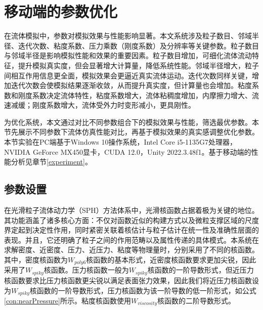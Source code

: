 







\section{移动端的参数优化}

在流体模拟中，参数对模拟效果与性能影响显著。本文系统涉及粒子数目、邻域半径、迭代次数、粘度系数、压力乘数（刚度系数）及分辨率等关键参数。粒子数目与邻域半径是影响模拟性能和效果的重要因素。粒子数目增加，可细化流体流动特征，提升模拟真实度，但会显著增大计算量，降低系统性能。邻域半径增大，粒子间相互作用信息更全面，模拟效果会更逼近真实流体运动。迭代次数同样关键，增加迭代次数会使模拟结果逐渐收敛，从而提升真实度，但计算量也会增加。粘度系数和刚度系数决定流体特性，粘度系数增大，流体粘稠度增加，内摩擦力增大、流速减缓；刚度系数增大，流体受外力时变形减小，更具刚性。

为优化系统，本文通过对比不同参数组合下的模拟效果与性能，筛选最优参数。本节先展示不同参数下流体仿真性能对比，再基于模拟效果的真实感调整优化参数。本节实验在PC端基于Windows 10操作系统，Intel Core i5-1135G7处理器，NVIDIA GeForce MX450显卡，CUDA 12.0，Unity 2022.3.48f1。基于移动端的性能分析见章节\ref{experiment}。

\subsection{参数设置}

在光滑粒子流体动力学（SPH）方法体系中，光滑核函数占据着极为关键的地位。其功能涵盖了诸多核心方面：不仅对函数近似的构建方式以及微粒支撑区域的尺度界定起到决定性作用，同时紧密关联着核估计与粒子估计在统一性及准确性层面的表现。并且，它还明确了粒子之间的作用范畴以及属性传递的具体模式。本系统在求解密度、近密度、压力、近压力、粘度等物理量时，分别采用了不同的核函数。其中，密度核函数为$W_{poly6}$核函数的基本形式，近密度核函数要求更加尖锐，因此采用了$W_{spiky}$核函数。压力核函数一般为$W_{spiky}$核函数的一阶导数形式，但近压力核函数要求比压力核函数更尖锐以满足表面张力效果，因此我们将近压力核函数设为$W_{spiky}$核函数的一阶导数形式，压力核函数为该一阶导数的低一阶形式，如公式\eqref{con:nearPressure}所示。粘度核函数使用$W_{viscosity}$核函数的二阶导数形式。

